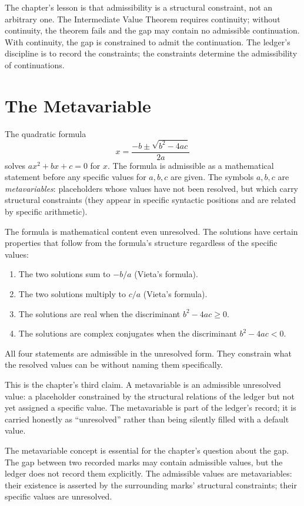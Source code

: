 The chapter's lesson is that admissibility is a structural
constraint, not an arbitrary one. The Intermediate Value Theorem
requires continuity; without continuity, the theorem fails and
the gap may contain no admissible continuation. With continuity,
the gap is constrained to admit the continuation. The ledger's
discipline is to record the constraints; the constraints determine
the admissibility of continuations.

\section{The Metavariable}
\label{se:the-metavariable}

The quadratic formula
\[
x = \frac{-b \pm \sqrt{b^2 - 4ac}}{2a}
\]
solves $ax^2 + bx + c = 0$ for $x$. The formula is admissible as a
mathematical statement before any specific values for $a, b, c$ are
given. The symbols $a, b, c$ are \emph{metavariables}: placeholders
whose values have not been resolved, but which carry structural
constraints (they appear in specific syntactic positions and are
related by specific arithmetic).

The formula is mathematical content even unresolved. The solutions
have certain properties that follow from the formula's structure
regardless of the specific values:
\begin{enumerate}
\item The two solutions sum to $-b/a$ (Vieta's formula).
\item The two solutions multiply to $c/a$ (Vieta's formula).
\item The solutions are real when the discriminant $b^2 - 4ac \ge 0$.
\item The solutions are complex conjugates when the discriminant
$b^2 - 4ac < 0$.
\end{enumerate}
All four statements are admissible in the unresolved form. They
constrain what the resolved values can be without naming them
specifically.

This is the chapter's third claim. A metavariable is an admissible
unresolved value: a placeholder constrained by the structural
relations of the ledger but not yet assigned a specific value.
The metavariable is part of the ledger's record; it is carried
honestly as ``unresolved'' rather than being silently filled with a
default value.

The metavariable concept is essential for the chapter's question
about the gap. The gap between two recorded marks may contain
admissible values, but the ledger does not record them explicitly.
The admissible values are metavariables: their existence is
asserted by the surrounding marks' structural constraints; their
specific values are unresolved.

